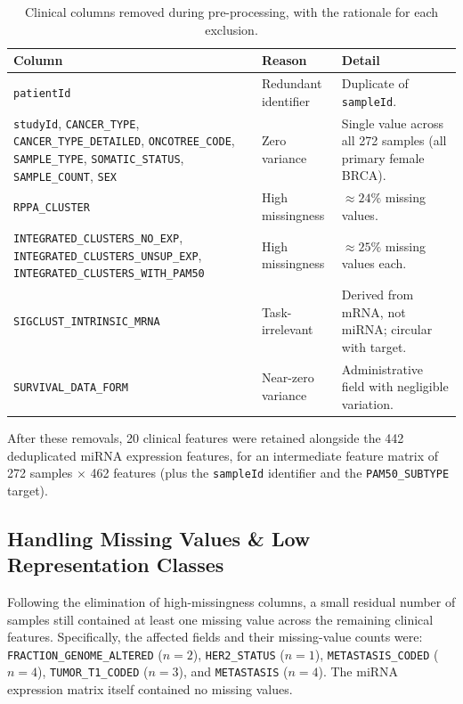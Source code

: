 \begin{table}[!ht]
\centering
\caption{Clinical columns removed during pre-processing, with the
rationale for each exclusion.}
\label{tab:dropped_features}
\small
\begin{tabular}{p{5.8cm} p{2.5cm} p{5.0cm}}
\hline
\textbf{Column} & \textbf{Reason} & \textbf{Detail} \\
\hline
\texttt{patientId}
    & Redundant identifier
    & Duplicate of \texttt{sampleId}. \\
\texttt{studyId}, \texttt{CANCER\_TYPE}, \texttt{CANCER\_TYPE\_DETAILED},
\texttt{ONCOTREE\_CODE}, \texttt{SAMPLE\_TYPE}, \texttt{SOMATIC\_STATUS},
\texttt{SAMPLE\_COUNT}, \texttt{SEX}
    & Zero variance
    & Single value across all 272 samples (all primary female BRCA). \\
\texttt{RPPA\_CLUSTER}
    & High missingness
    & ${\approx}24\%$ missing values. \\
\texttt{INTEGRATED\_CLUSTERS\_NO\_EXP}, \texttt{INTEGRATED\_CLUSTERS\_UNSUP\_EXP},
\texttt{INTEGRATED\_CLUSTERS\_WITH\_PAM50}
    & High missingness
    & ${\approx}25\%$ missing values each. \\
\texttt{SIGCLUST\_INTRINSIC\_MRNA}
    & Task-irrelevant
    & Derived from mRNA, not miRNA; circular with target. \\
\texttt{SURVIVAL\_DATA\_FORM}
    & Near-zero variance
    & Administrative field with negligible variation. \\
\hline
\end{tabular}
\end{table}

After these removals, 20 clinical features were retained alongside the 442
deduplicated miRNA expression features, for an intermediate feature matrix of
272 samples $\times$ 462 features (plus the \texttt{sampleId} identifier and
the \texttt{PAM50\_SUBTYPE} target).


\subsection{Handling Missing Values \& Low Representation Classes}
\label{subsec:missing_values}

Following the elimination of high-missingness columns, a small residual
number of samples still contained at least one missing value across the
remaining clinical features. Specifically, the affected fields and their
missing-value counts were: \texttt{FRACTION\_GENOME\_ALTERED} ($n = 2$),
\texttt{HER2\_STATUS} ($n = 1$), \texttt{METASTASIS\_CODED} ($n = 4$),
\texttt{TUMOR\_T1\_CODED} ($n = 3$), and \texttt{METASTASIS} ($n = 4$).
The miRNA expression matrix itself contained no missing values.

